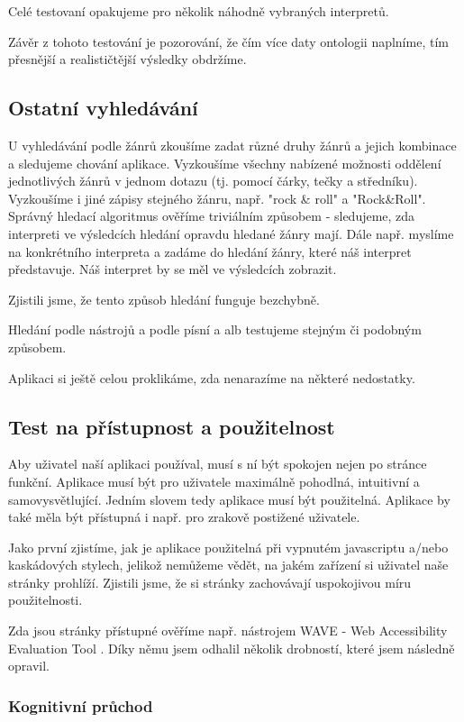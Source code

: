 Celé testovaní opakujeme pro několik náhodně vybraných interpretů.

Závěr z tohoto testování je pozorování, že čím více daty ontologii naplníme, tím přesnější a realističtější výsledky obdržíme.

\subsection{Ostatní vyhledávání}

U vyhledávání podle žánrů zkoušíme zadat různé druhy žánrů a jejich kombinace a sledujeme chování aplikace. Vyzkoušíme všechny nabízené možnosti oddělení jednotlivých žánrů v jednom dotazu (tj. pomocí čárky, tečky a středníku). Vyzkoušíme i jiné zápisy stejného žánru, např. "rock \& roll" a "Rock\&Roll". 
Správný hledací algoritmus ověříme triviálním způsobem - sledujeme, zda interpreti ve výsledcích hledání opravdu hledané žánry mají. 
Dále např. myslíme na konkrétního interpreta a zadáme do hledání žánry, které náš interpret představuje. Náš interpret by se měl ve výsledcích zobrazit.

Zjistili jsme, že tento způsob hledání funguje bezchybně.

Hledání podle nástrojů a podle písní a alb testujeme stejným či podobným způsobem.

Aplikaci si ještě celou proklikáme, zda nenarazíme na některé nedostatky. 


\subsection{Test na přístupnost a použitelnost}

Aby uživatel naší aplikaci používal, musí s ní být spokojen nejen po stránce funkční. Aplikace musí být pro uživatele maximálně pohodlná, intuitivní a samovysvětlující. Jedním slovem tedy aplikace musí být použitelná.
Aplikace by také měla být přístupná i např. pro zrakově postižené uživatele.

Jako první zjistíme, jak je aplikace použitelná při vypnutém javascriptu a/nebo kaskádových stylech, jelikož nemůžeme vědět, na jakém zařízení si uživatel naše stránky prohlíží.
Zjistili jsme, že si stránky zachovávají uspokojivou míru použitelnosti.

Zda jsou stránky přístupné ověříme např. nástrojem WAVE - Web Accessibility Evaluation Tool \cite{wave}. Díky němu jsem odhalil několik drobností, které jsem následně opravil.

\subsubsection{Kognitivní průchod}

